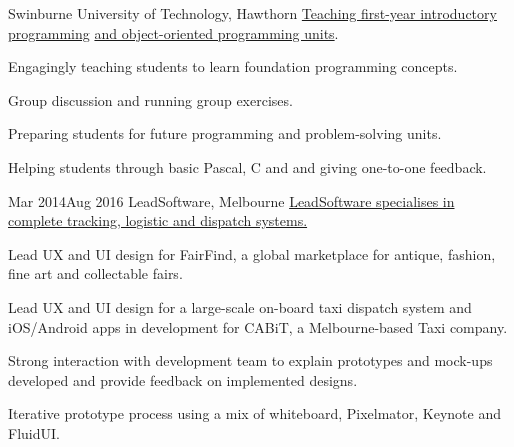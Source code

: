 {        {Swinburne University of Technology, Hawthorn}
        {\href{http://www.swinburne.edu.au/study/courses/units/Introduction-to-Programming-COS10009/local}{Teaching first-year introductory programming} \href{http://www.swinburne.edu.au/study/courses/units/Object-Oriented-Programming-COS70006/local}{and object-oriented programming units}.}
        {
          \item Engagingly teaching students to learn foundation programming concepts.
          \item Group discussion and running group exercises.
          \item Preparing students for future programming and problem-solving units.
          \item Helping students through basic Pascal, C and \Csh\hspace{0.25ex}and giving one-to-one feedback.
        }
        {Mar 2014}{Aug 2016}
        {LeadSoftware, Melbourne}
        {\href{http://www.leadsoftware.com.au/}{LeadSoftware specialises in complete tracking, logistic and dispatch systems.}}
        {
          \item Lead UX and UI design for FairFind, a global marketplace for antique, fashion, fine art and collectable fairs.
          \item Lead UX and UI design for a large-scale on-board taxi dispatch system and iOS/Android apps in development for CABiT, a Melbourne-based Taxi company.
          \item Strong interaction with development team to explain prototypes and mock-ups developed and provide feedback on implemented designs.
          \item Iterative prototype process using a mix of whiteboard, Pixelmator, Keynote and FluidUI.
        }
}
